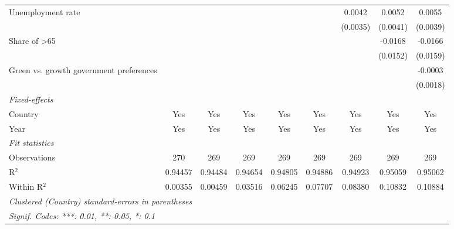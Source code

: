 \begin{table}[htbp]
\begin{tabular}{lcccccccc}
      Unemployment rate                                                       &          &          &          &          &          & 0.0042   & 0.0052   & 0.0055\\   
                                                                              &          &          &          &          &          & (0.0035) & (0.0041) & (0.0039)\\   
      Share of >65                                                            &          &          &          &          &          &          & -0.0168  & -0.0166\\   
                                                                              &          &          &          &          &          &          & (0.0152) & (0.0159)\\   
      Green vs. growth government preferences                                 &          &          &          &          &          &          &          & -0.0003\\   
                                                                              &          &          &          &          &          &          &          & (0.0018)\\   
      \midrule
      \emph{Fixed-effects}\\
      Country                                                                 & Yes      & Yes      & Yes      & Yes      & Yes      & Yes      & Yes      & Yes\\  
      Year                                                                    & Yes      & Yes      & Yes      & Yes      & Yes      & Yes      & Yes      & Yes\\  
      \midrule
      \emph{Fit statistics}\\
      Observations                                                            & 270      & 269      & 269      & 269      & 269      & 269      & 269      & 269\\  
      R$^2$                                                                   & 0.94457  & 0.94484  & 0.94654  & 0.94805  & 0.94886  & 0.94923  & 0.95059  & 0.95062\\  
      Within R$^2$                                                            & 0.00355  & 0.00459  & 0.03516  & 0.06245  & 0.07707  & 0.08380  & 0.10832  & 0.10884\\  
      \midrule \midrule
      \multicolumn{9}{l}{\emph{Clustered (Country) standard-errors in parentheses}}\\
      \multicolumn{9}{l}{\emph{Signif. Codes: ***: 0.01, **: 0.05, *: 0.1}}\\
   \end{tabular}
\end{table}


